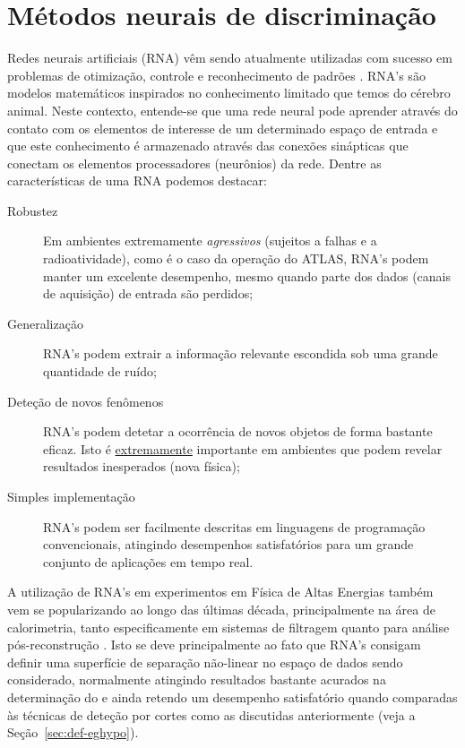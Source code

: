 \section{Métodos neurais de discriminação}
\label{sec:neural}

Redes neurais artificiais (RNA) vêm sendo atualmente utilizadas com sucesso em
problemas de otimização, controle e reconhecimento de padrões
\cite{haykin}. RNA's são modelos matemáticos inspirados no conhecimento
limitado que temos do cérebro animal. Neste contexto, entende-se que uma rede
neural pode aprender através do contato com os elementos de interesse de um
determinado espaço de entrada e que este conhecimento é armazenado através das
conexões sinápticas que conectam os elementos processadores (neurônios) da
rede. Dentre as características de uma RNA podemos destacar:

\begin{description}
\item[Robustez] Em ambientes extremamente \emph{agressivos} (sujeitos a falhas
e a radioatividade), como é o caso da operação do ATLAS, RNA's podem manter um
excelente desempenho, mesmo quando parte dos dados (canais de aquisição) de
entrada são perdidos;

\item[Generalização] RNA's podem extrair a informação relevante escondida sob
uma grande quantidade de ruído;

\item[Deteção de novos fenômenos] RNA's podem detetar a ocorrência de novos
objetos de forma bastante eficaz. Isto é \underline{extremamente} importante
em ambientes que podem revelar resultados inesperados (nova física);

\item[Simples implementação] RNA's podem ser facilmente descritas em
linguagens de programação convencionais, atingindo desempenhos satisfatórios
para um grande conjunto de aplicações em tempo real.
\end{description}

A utilização de RNA's em experimentos em Física de Altas Energias também vem
se popularizando ao longo das últimas década, principalmente na área de
calorimetria, tanto especificamente em sistemas de filtragem \cite{badgett92,
koehne96} quanto para análise pós-reconstrução \cite{altherr90}. Isto se deve
principalmente ao fato que RNA's consigam definir uma superfície de separação
não-linear no espaço de dados sendo considerado, normalmente atingindo
resultados bastante acurados na determinação do  e ainda
retendo um desempenho satisfatório quando comparadas às técnicas de deteção
por cortes como as discutidas anteriormente (veja a
Seção~\ref{sec:def-eghypo}).

